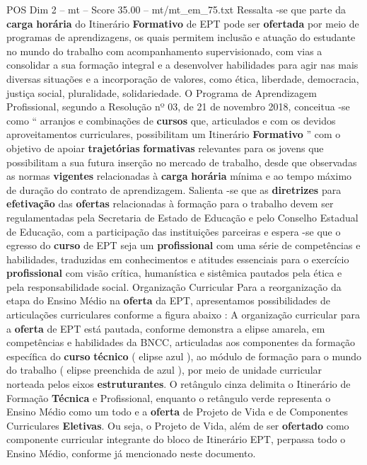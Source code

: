 \begin{textsample}{POS Dim 2 – mt – Score 35.00 – mt/mt\_em\_75.txt}
Ressalta -se que parte da \textbf{carga} \textbf{horária} do Itinerário \textbf{Formativo} de EPT pode ser \textbf{ofertada} por meio de programas de aprendizagens, os quais permitem inclusão e atuação do estudante no mundo do trabalho com acompanhamento supervisionado, com vias a consolidar a sua formação integral e a desenvolver habilidades para agir nas mais diversas situações e a incorporação de valores, como ética, liberdade, democracia, justiça social, pluralidade, solidariedade.
O Programa de Aprendizagem Profissional, segundo a Resolução nº 03, de 21 de novembro 2018, conceitua -se como “ arranjos e combinações de \textbf{cursos} que, articulados e com os devidos aproveitamentos curriculares, possibilitam um Itinerário \textbf{Formativo} ” com o objetivo de apoiar \textbf{trajetórias} \textbf{formativas} relevantes para os jovens que possibilitam a sua futura inserção no mercado de trabalho, desde que observadas as normas \textbf{vigentes} relacionadas à \textbf{carga} \textbf{horária} mínima e ao tempo máximo de duração do contrato de aprendizagem.
Salienta -se que as \textbf{diretrizes} para \textbf{efetivação} das \textbf{ofertas} relacionadas à formação para o trabalho devem ser regulamentadas pela Secretaria de Estado de Educação e pelo Conselho Estadual de Educação, com a participação das instituições parceiras e espera -se que o egresso do \textbf{curso} de EPT seja um \textbf{profissional} com uma série de competências e habilidades, traduzidas em conhecimentos e atitudes essenciais para o exercício \textbf{profissional} com visão crítica, humanística e sistêmica pautados pela ética e pela responsabilidade social.
Organização Curricular Para a reorganização da etapa do Ensino Médio na \textbf{oferta} da EPT, apresentamos possibilidades de articulações curriculares conforme a figura abaixo : A organização curricular para a \textbf{oferta} de EPT está pautada, conforme demonstra a elipse amarela, em competências e habilidades da BNCC, articuladas aos componentes da formação específica do \textbf{curso} \textbf{técnico} ( elipse azul ), ao módulo de formação para o mundo do trabalho ( elipse preenchida de azul ), por meio de unidade curricular norteada pelos eixos \textbf{estruturantes}.
O retângulo cinza delimita o Itinerário de Formação \textbf{Técnica} e Profissional, enquanto o retângulo verde representa o Ensino Médio como um todo e a \textbf{oferta} de Projeto de Vida e de Componentes Curriculares \textbf{Eletivas}.
Ou seja, o Projeto de Vida, além de ser \textbf{ofertado} como componente curricular integrante do bloco de Itinerário EPT, perpassa todo o Ensino Médio, conforme já mencionado neste documento.

\end{textsample}
